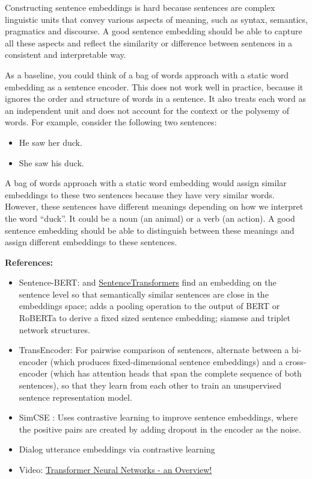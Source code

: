 \documentclass[11pt, a4paper]{amsart}
\begin{document}
Constructing sentence embeddings is hard because sentences are complex linguistic units that convey various aspects of meaning, such as syntax, semantics, pragmatics and discourse.
A good sentence embedding should be able to capture all these aspects and reflect the similarity or difference between sentences in a consistent and interpretable way.

As a baseline, you could think of a bag of words approach with a static word embedding as a sentence encoder.
This does not work well in practice, because it ignores the order and structure of words in a sentence.
It also treats each word as an independent unit and does not account for the context or the polysemy of words.
For example, consider the following two sentences:
\begin{itemize}
	\item He saw her duck.
	\item She saw his duck.
\end{itemize}

A bag of words approach with a static word embedding would assign similar embeddings to these two sentences because they have very similar words.
However, these sentences have different meanings depending on how we interpret the word ``duck''.
It could be a noun (an animal) or a verb (an action).
A good sentence embedding should be able to distinguish between these meanings and assign different embeddings to these sentences.

\noindent \textbf{References:}
\begin{itemize}
	\item Sentence-BERT: \cite{DBLP:journals/corr/abs-1908-10084} and \href{https://www.sbert.net/}{SentenceTransformers}
	find an embedding on the sentence level so that semantically similar sentences are close in the embeddings space;
	adds a pooling operation to the output of BERT or RoBERTa to derive a fixed sized sentence embedding;
	siamese and triplet network structures.
	\item TransEncoder: For pairwise comparison of sentences, \cite{DBLP:journals/corr/abs-2109-13059} alternate between a bi-encoder (which produces fixed-dimensional sentence embeddings) and a cross-encoder (which has attention heads that span the complete sequence of both sentences), so that they learn from each other to train an unsupervised sentence representation model.
	\item SimCSE \cite{DBLP:journals/corr/abs-2104-08821}: Uses contrastive learning to improve sentence embeddings, where the positive pairs are created by adding dropout in the encoder as the noise.
	\item Dialog utterance embeddings via contrastive learning \cite{https://doi.org/10.48550/arxiv.2205.13568}
	\item Video: \href{https://youtu.be/O3xbVmpdJwU}{Transformer Neural Networks - an Overview!}
\end{itemize}
\end{document}
